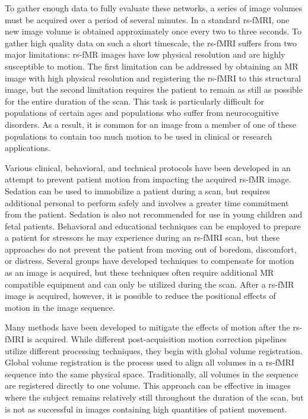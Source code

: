 To gather enough data to fully evaluate these networks, a series of image volumes must be acquired over a period of several minutes. In a standard rs-fMRI, one new image volume is obtained approximately once every two to three seconds. To gather high quality data on such a short timescale, the rs-fMRI suffers from two major limitations: rs-fMR images have low physical resolution and are highly susceptible to motion. The first limitation can be addressed by obtaining an MR image with high physical resolution and registering the rs-fMRI to this structural image, but the second limitation requires the patient to remain as still as possible for the entire duration of the scan. This task is particularly difficult for populations of certain ages and populations who suffer from neurocognitive disorders. As a result, it is common for an image from a member of one of these populations to contain too much motion to be used in clinical or research applications.

Various clinical, behavioral, and technical protocols have been developed in an attempt to prevent patient motion from impacting the acquired rs-fMR image. Sedation can be used to immobilize a patient during a scan, but requires additional personal to perform safely and involves a greater time commitment from the patient. Sedation is also not recommended for use in young children and fetal patients. Behavioral and educational techniques can be employed to prepare a patient for stressors he may experience during an rs-fMRI scan, but these approaches do not prevent the patient from moving out of boredom, discomfort, or distress. Several groups have developed techniques to compensate for motion as an image is acquired, but these techniques often require additional MR compatible equipment and can only be utilized during the scan. After a rs-fMR image is acquired, however, it is possible to reduce the positional effects of motion in the image sequence.

Many methods have been developed to mitigate the effects of motion after the rs-fMRI is acquired. While different post-acquisition motion correction pipelines utilize different processing techniques, they begin with global volume registration. Global volume registration is the process used to align all volumes in a rs-fMRI sequence into the same physical space. Traditionally, all volumes in the sequence are registered directly to one volume. This approach can be effective in images where the subject remains relatively still throughout the duration of the scan, but is not as successful in images containing high quantities of patient movement.

